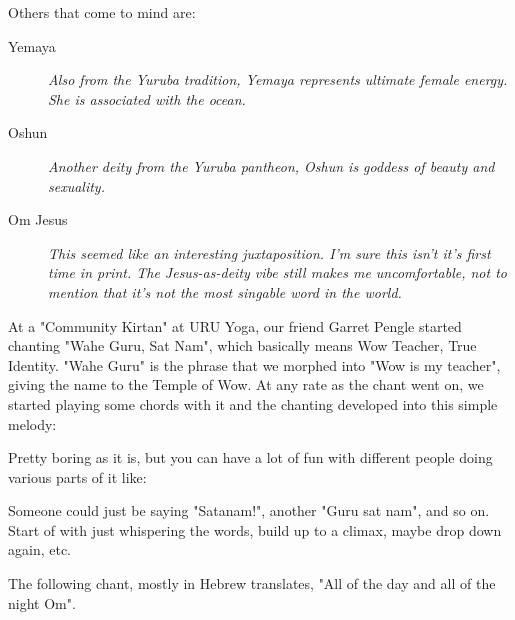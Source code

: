 \documentclass[a5paper,twoside,9pt]{extbook}
\newtheorem{I Surrender}{Definition}
\begin{document}
Others that come to mind are:

\begin{addmargin}[3em]{3em}
\begin{description}
\item[Yemaya]
\textit{Also from the Yuruba tradition, Yemaya represents ultimate female energy. She is associated with the ocean.}

\item[Oshun]
\textit{Another deity from the Yuruba pantheon, Oshun is goddess of beauty and sexuality.}

\item[Om Jesus]
\textit{This seemed like an interesting juxtaposition. I'm sure this isn't it's first time in print. The Jesus-as-deity vibe still makes me uncomfortable, not to mention that it's not the most singable word in the world.}
\end{description}
\end{addmargin}

At a "Community Kirtan" at URU Yoga, our friend Garret Pengle started chanting "Wahe Guru, Sat Nam", which basically means Wow Teacher, True Identity. "Wahe Guru" is the phrase that we morphed into "Wow is my teacher", giving the name to the Temple of Wow. At any rate as the chant went on, we started playing some chords with it and the chanting developed into this simple melody:

\begin{quote}
{%
\parindent 0pt
\noindent
\ifx\preLilyPondExample \undefined
\else
  \expandafter\preLilyPondExample
\fi
\def\lilypondbook{}%

\ifx\postLilyPondExample \undefined
\else
  \expandafter\postLilyPondExample
\fi
}
\end{quote}

Pretty boring as it is, but you can have a lot of fun with different people doing various parts of it like:

\begin{quote}
{%
\parindent 0pt
\noindent
\ifx\preLilyPondExample \undefined
\else
  \expandafter\preLilyPondExample
\fi
\def\lilypondbook{}%

\ifx\postLilyPondExample \undefined
\else
  \expandafter\postLilyPondExample
\fi
}
\end{quote}

Someone could just be saying "Satanam!", another "Guru sat nam", and so on. Start of with just whispering the words, build up to a climax, maybe drop down again, etc.

The following chant, mostly in Hebrew translates, "All of the day and all of the night Om".
\end{document}
